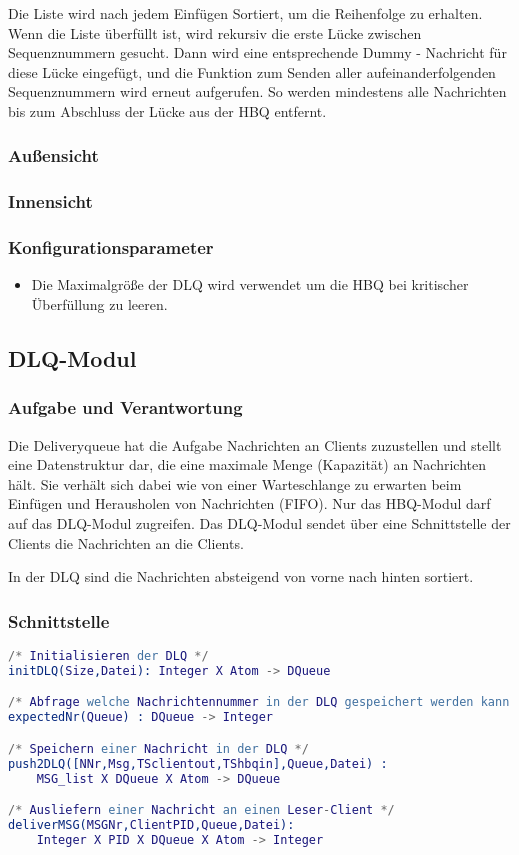\documentclass{article}
\begin{document}
Die Liste wird nach jedem Einfügen Sortiert, um die Reihenfolge zu erhalten. Wenn die Liste überfüllt ist,
wird rekursiv die erste Lücke zwischen Sequenznummern gesucht. Dann wird eine entsprechende 
Dummy - Nachricht für diese Lücke eingefügt, und die Funktion zum Senden aller aufeinanderfolgenden Sequenznummern wird erneut aufgerufen.
So werden mindestens alle Nachrichten bis zum Abschluss der Lücke aus der HBQ entfernt.

				
\subsubsection{Außensicht}

\subsubsection{Innensicht}

\subsubsection{Konfigurationsparameter}
\begin{itemize}
	\item Die Maximalgröße der DLQ wird verwendet um die HBQ bei kritischer Überfüllung zu leeren.
\end{itemize}
\newpage

\subsection{DLQ-Modul}
\subsubsection{Aufgabe und Verantwortung}
Die Deliveryqueue hat die Aufgabe Nachrichten an Clients zuzustellen und stellt eine Datenstruktur dar, die eine
maximale Menge (Kapazität) an Nachrichten hält. Sie verhält sich dabei wie von einer Warteschlange zu erwarten beim
Einfügen und Herausholen von Nachrichten (FIFO). Nur das HBQ-Modul darf auf das DLQ-Modul zugreifen. Das DLQ-Modul
sendet über eine Schnittstelle der Clients die Nachrichten an die Clients.

In der DLQ sind die Nachrichten absteigend von vorne nach hinten sortiert.

\subsubsection{Schnittstelle}
\begin{lstlisting}[language=erlang]
/* Initialisieren der DLQ */
initDLQ(Size,Datei): Integer X Atom -> DQueue

/* Abfrage welche Nachrichtennummer in der DLQ gespeichert werden kann */
expectedNr(Queue) : DQueue -> Integer

/* Speichern einer Nachricht in der DLQ */
push2DLQ([NNr,Msg,TSclientout,TShbqin],Queue,Datei) :
    MSG_list X DQueue X Atom -> DQueue

/* Ausliefern einer Nachricht an einen Leser-Client */
deliverMSG(MSGNr,ClientPID,Queue,Datei):
    Integer X PID X DQueue X Atom -> Integer
\end{lstlisting}
\end{document}
